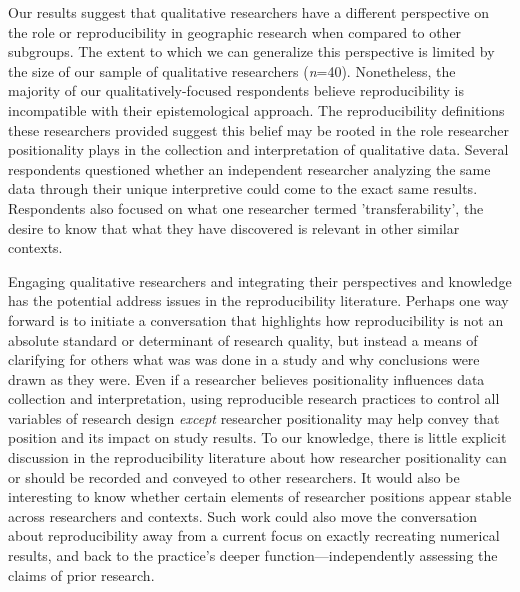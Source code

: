 \documentclass[]{interact}
\theoremstyle{plain}%
\theoremstyle{definition}
\theoremstyle{remark}
\begin{document}
Our results suggest that qualitative researchers have a different perspective on the role or reproducibility in geographic research when compared to other subgroups.
The extent to which we can generalize this perspective is limited by the size of our sample of qualitative researchers (\textit{n}=40).  
Nonetheless, the majority of our qualitatively-focused respondents believe reproducibility is incompatible with their epistemological approach.  
The reproducibility definitions these researchers provided suggest this belief may be rooted in the role researcher positionality plays in the collection and interpretation of qualitative data. 
Several respondents questioned whether an independent researcher analyzing the same data through their unique interpretive could come to the exact same results. 
Respondents also focused on what one researcher termed 'transferability', the desire to know that what they have discovered is relevant in other similar contexts. 

Engaging qualitative researchers and integrating their perspectives and knowledge has the potential address issues in the reproducibility literature.  
Perhaps one way forward is to initiate a conversation that highlights how reproducibility is not an absolute standard or determinant of research quality, but instead a means of clarifying for others what was was done in a study and why conclusions were drawn as they were.
Even if a researcher believes positionality influences data collection and interpretation, using reproducible research practices to control all variables of research design \textit{except} researcher positionality may help convey that position and its impact on study results.
To our knowledge, there is little explicit discussion in the reproducibility literature about how researcher positionality can or should be recorded and conveyed to other researchers. 
It would also be interesting to know whether certain elements of researcher positions appear stable across researchers and contexts.
Such work could also move the conversation about reproducibility away from a current focus on exactly recreating numerical results, and back to the practice's deeper function---independently assessing the claims of prior research. 

\end{document}
